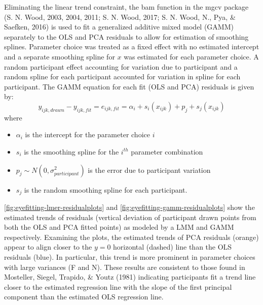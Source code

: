 \documentclass[print]{nuthesis}
\providecommand{\tightlist}{%
  \setlength{\itemsep}{0pt}\setlength{\parskip}{0pt}}
\begin{document}
Eliminating the linear trend constraint, the bam function in the mgcv package (S. N. Wood, 2003, 2004, 2011; S. N. Wood, 2017; S. N. Wood, N., Pya, \& Saefken, 2016) is used to fit a generalized additive mixed model (GAMM) separately to the OLS and PCA residuals to allow for estimation of smoothing splines.
Parameter choice was treated as a fixed effect with no estimated intercept and a separate smoothing spline for \(x\) was estimated for each parameter choice. A random participant effect accounting for variation due to participant and a random spline for each participant accounted for variation in spline for each participant.
The GAMM equation for each fit (OLS and PCA) residuals is given by:
\begin{equation}
y_{ijk, drawn} - y_{ijk, fit} = e_{ijk,fit} = \alpha_i + s_{i}(x_{ijk}) + p_{j} + s_{j}(x_{ijk})
\end{equation}
\noindent where

\begin{itemize}
\tightlist
\item
  \(\alpha_i\) is the intercept for the parameter choice \(i\)
\item
  \(s_{i}\) is the smoothing spline for the \(i^{th}\) parameter combination
\item
  \(p_{j} \sim N(0, \sigma^2_{participant})\) is the error due to participant variation
\item
  \(s_{j}\) is the random smoothing spline for each participant.
\end{itemize}

\cref{fig:eyefitting-lmer-residualplots} and \cref{fig:eyefitting-gamm-residualplots} show the estimated trends of residuals (vertical deviation of participant drawn points from both the OLS and PCA fitted points) as modeled by a LMM and GAMM respectively.
Examining the plots, the estimated trends of PCA residuals (orange) appear to align closer to the \(y=0\) horizontal (dashed) line than the OLS residuals (blue).
In particular, this trend is more prominent in parameter choices with large variances (F and N).
These results are consistent to those found in Mosteller, Siegel, Trapido, \& Youtz (1981) indicating participants fit a trend line closer to the estimated regression line with the slope of the first principal component than the estimated OLS regression line.
\end{document}
